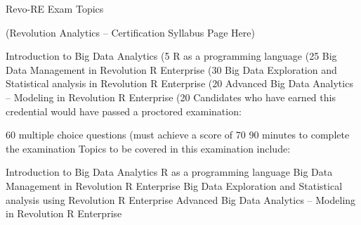 Revo-RE
Exam Topics 

(Revolution Analytics – Certification Syllabus Page Here)

Introduction to Big Data Analytics (5%
R as a programming language (25%
Big Data Management in Revolution R Enterprise (30%
Big Data Exploration and Statistical analysis in Revolution R Enterprise (20%
Advanced Big Data Analytics – Modeling in Revolution R Enterprise (20%
Candidates who have earned this credential would have passed a proctored examination:

60 multiple choice questions (must achieve a score of 70%
90 minutes to complete the examination
Topics to be covered in this examination include:

Introduction to Big Data Analytics
R as a programming language
Big Data Management in Revolution R Enterprise
Big Data Exploration and Statistical analysis using Revolution R Enterprise
Advanced Big Data Analytics – Modeling in Revolution R Enterprise
